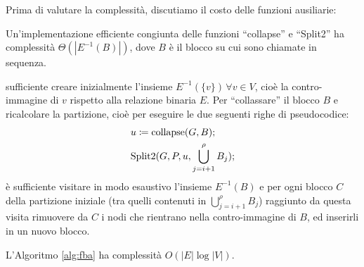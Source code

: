 Prima di valutare la complessità, discutiamo il costo delle funzioni ausiliarie:
\begin{observation}
    Un'implementazione efficiente congiunta delle funzioni ``collapse'' e ``Split2'' ha complessità $\Theta(|E^{-1}(B)|)$, dove $B$ è il blocco su cui sono chiamate in sequenza.
\end{observation}
\begin{proof2}
    \accente sufficiente creare inizialmente l'insieme $E^{-1}(\{v\}) \, \forall v \in V$, cioè la contro-immagine di $v$ rispetto alla relazione binaria $E$. Per ``collassare'' il blocco $B$ e ricalcolare la partizione, cioè per eseguire le due seguenti righe di pseudocodice:
    \begin{align*}
        &u \coloneqq \textup{collapse}(G,B);\\
        &\textup{Split2}(G, P, u, \bigcup_{j=i+1}^\rho B_j);
    \end{align*}
    è sufficiente visitare in modo esaustivo l'insieme $E^{-1}(B)$ e per ogni blocco $C$ della partizione iniziale (tra quelli contenuti in $\bigcup_{j=i+1}^\rho B_j$) raggiunto da questa visita rimuovere da $C$ i nodi che rientrano nella contro-immagine di $B$, ed inserirli in un nuovo blocco.
\end{proof2}
\begin{theorem}
    L'Algoritmo \ref{alg:fba} ha complessità $O(|E| \log |V|)$.
\end{theorem}
